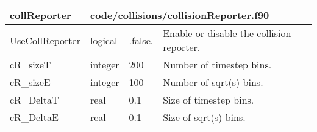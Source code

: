 \documentclass{article}
\begin{document}
\begin{longtable}{llll}
\toprule
\textbf{\large{collReporter}} & \multicolumn{3}{l}{\footnotesize{code/collisions/collisionReporter.f90}}\\*
\midrule
\endfirsthead
\midrule
\endhead
UseCollReporter & \begin{minipage}[t]{2cm}logical\end{minipage} & \begin{minipage}[t]{2cm}.false.\end{minipage} & \begin{minipage}[t]{12cm}Enable or disable the collision reporter.\end{minipage}\\*
\midrule
cR\_sizeT & \begin{minipage}[t]{2cm}integer\end{minipage} & \begin{minipage}[t]{2cm}200\end{minipage} & \begin{minipage}[t]{12cm}Number of timestep bins.\end{minipage}\\*
\midrule
cR\_sizeE & \begin{minipage}[t]{2cm}integer\end{minipage} & \begin{minipage}[t]{2cm}100\end{minipage} & \begin{minipage}[t]{12cm}Number of sqrt(s) bins.\end{minipage}\\*
\midrule
cR\_DeltaT & \begin{minipage}[t]{2cm}real\end{minipage} & \begin{minipage}[t]{2cm}0.1\end{minipage} & \begin{minipage}[t]{12cm}Size of timestep bins.\end{minipage}\\*
\midrule
cR\_DeltaE & \begin{minipage}[t]{2cm}real\end{minipage} & \begin{minipage}[t]{2cm}0.1\end{minipage} & \begin{minipage}[t]{12cm}Size of sqrt(s) bins.\end{minipage}\\*
\bottomrule
\end{longtable}
{ }
\end{document}

